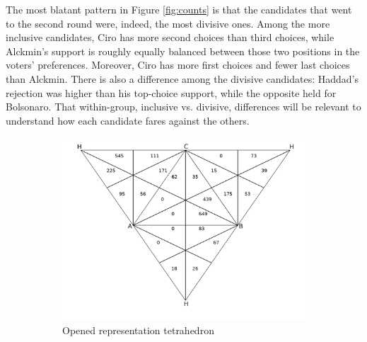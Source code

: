\documentclass[hidelinks,11pt]{article} \usepackage[utf8]{inputenc}
\begin{document}
The most blatant pattern in Figure \ref{fig:counts} is that the candidates that went to the
second round were, indeed, the most divisive ones. Among the more inclusive
candidates, Ciro has more second choices than third choices, while Alckmin's
support is roughly equally balanced between those two positions in the voters'
preferences. Moreover, Ciro has more first choices and fewer last choices than
Alckmin. There is also a difference among the divisive candidates: Haddad's
rejection was higher than his top-choice support, while the opposite held for
Bolsonaro. That within-group, inclusive vs. divisive, differences will be
relevant to understand how each candidate fares against the others.

\begin{figure}[!h] \centering
  \begin{subfigure}[b]{0.8\textwidth} \centering
\includegraphics[width=\textwidth]{./images/representation_tetrahedron.png}
 \caption{Opened representation tetrahedron}
 \label{fig:rep_ot}
\end{subfigure} \hfill
  \begin{subfigure}[b]{0.8\textwidth} \centering

\end{subfigure}
\end{figure}
\end{document}
